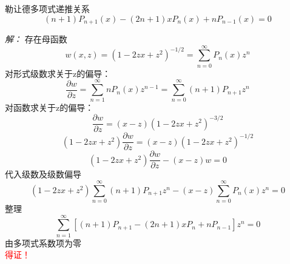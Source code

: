 	\begin{proposition} 勒让德多项式递推关系
		\begin{equation*}
			(n+1) P_{n+1}(x)-(2 n+1) x P_{n}(x)+n P_{n-1}(x)=0
		\end{equation*}	
	\end{proposition}
		\emph{解：}
			存在母函数
			\begin{equation*}
				w(x, z)=(1-2zx+z^2)^{-1/2}=\sum_{n=0}^{\infty} P_{n}(x) z^{n}
			\end{equation*}	
			对形式级数求关于z的偏导：
			\begin{equation*}
				\frac{\partial w}{\partial z}=\sum_{n=1}^{\infty} n P_{n}(x) z^{n-1}=\sum_{n=0}^{\infty}(n+1) P_{n+1} z^{n}
			\end{equation*}	
			对函数求关于z的偏导：
			\begin{equation*}
				\frac{\partial w}{\partial z}=	(x-z)(1-2zx+z^2)^{-3/2}
			\end{equation*}		
			\begin{equation*}
				(1-2zx+z^2)\frac{\partial w}{\partial z}=(x-z)(1-2zx+z^2)^{-1/2}
			\end{equation*}		
			\begin{equation*}
				(1-2zx+z^2)\frac{\partial w}{\partial z}-(x-z)w=0
			\end{equation*}	
			代入级数及级数偏导	
			\begin{equation*}
				(1-2zx+z^2)\sum_{n=0}^{\infty}(n+1) P_{n+1} z^{n}-(x-z)\sum_{n=0}^{\infty} P_{n}(x) z^{n}=0
			\end{equation*}		
			整理
			\begin{equation*}
				\sum_{n=1}^{\infty} [(n+1)P_{n+1} -(2n+1)x P_n + nP_{n-1} ] z^{n}=0
			\end{equation*}		
			由多项式系数项为零\\ \textcolor{red}{得证！}
	
		~~\\ 
	
